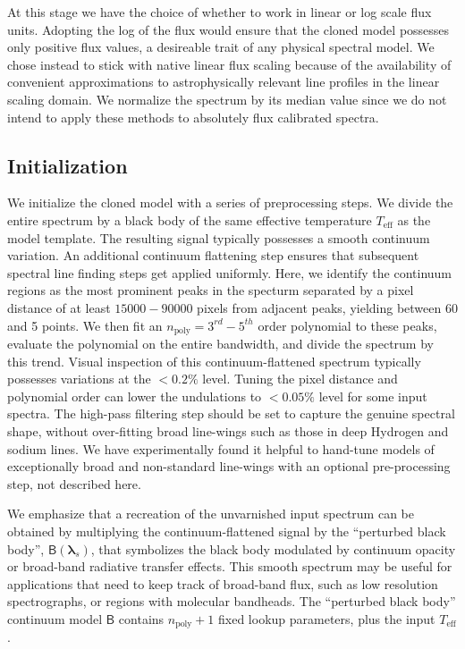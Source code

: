 \documentclass[modern]{aastex631}
\begin{document}
At this stage we have the choice of whether to work in linear or log scale flux units.  Adopting the log of the flux would ensure that the cloned model possesses only positive flux values, a desireable trait of any physical spectral model.  We chose instead to stick with native linear flux scaling because of the availability of convenient approximations to astrophysically relevant line profiles in the linear scaling domain.  We normalize the spectrum by its median value since we do not intend to apply these methods to absolutely flux calibrated spectra.

\subsection{Initialization}

We initialize the cloned model with a series of preprocessing steps.  We divide the entire spectrum by a black body of the same effective temperature $T_{\mathrm{eff}}$ as the model template.  The resulting signal typically possesses a smooth continuum variation.  An additional continuum flattening step ensures that subsequent spectral line finding steps get applied uniformly.  Here, we identify the continuum regions as the most prominent peaks in the specturm separated by a pixel distance of at least $15000-90000$ pixels from adjacent peaks, yielding between 60 and 5 points.  We then fit an $n_{\mathrm{poly}} = 3^{rd}-5^{th}$ order polynomial to these peaks, evaluate the polynomial on the entire bandwidth, and divide the spectrum by this trend.  Visual inspection of this continuum-flattened spectrum typically possesses variations at the $<0.2\%$ level.  Tuning the pixel distance and polynomial order can lower the undulations to $<0.05\%$ level for some input spectra.  The high-pass filtering step should be set to capture the genuine spectral shape, without over-fitting broad line-wings such as those in deep Hydrogen and sodium lines.  We have experimentally found it helpful to hand-tune models of exceptionally broad and non-standard line-wings with an optional pre-processing step, not described here.

We emphasize that a recreation of the unvarnished input spectrum can be obtained by multiplying the continuum-flattened signal by the ``perturbed black body'', $\mathsf{B}(\bm{\lambda}_s)$, that symbolizes the black body modulated by continuum opacity or broad-band radiative transfer effects.  This smooth spectrum may be useful for applications that need to keep track of broad-band flux, such as low resolution spectrographs, or regions with molecular bandheads.  The ``perturbed black body'' continuum model $\mathsf{B}$ contains  $n_{\mathrm{poly}}+1$ fixed lookup parameters, plus the input $T_{\mathrm{eff}}$.
\end{document}

